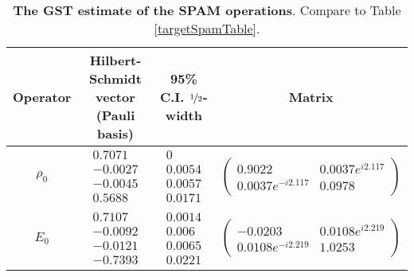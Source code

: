 \documentclass{article}[11pt]
\begin{document}
\begin{table}[h]
\begin{center}
\begin{tabular}[l]{|c|c|c|c|}
\hline
Operator & Hilbert-Schmidt vector (Pauli basis) & 95\% C.I. $\nicefrac{1}{2}$-width & Matrix \\ \hline
$\rho_{0}$ & $ \begin{array}{c}
0.7071 \\ 
-0.0027 \\ 
-0.0045 \\ 
0.5688
 \end{array} $
 & $ \begin{array}{c}
0 \\ 
0.0054 \\ 
0.0057 \\ 
0.0171
 \end{array} $
 & $ \left(\!\!\begin{array}{cc}
0.9022 & 0.0037e^{i2.117} \\ 
0.0037e^{-i2.117} & 0.0978
 \end{array}\!\!\right) $
 \\ \hline
$E_{0}$ & $ \begin{array}{c}
0.7107 \\ 
-0.0092 \\ 
-0.0121 \\ 
-0.7393
 \end{array} $
 & $ \begin{array}{c}
0.0014 \\ 
0.006 \\ 
0.0065 \\ 
0.0221
 \end{array} $
 & $ \left(\!\!\begin{array}{cc}
-0.0203 & 0.0108e^{i2.219} \\ 
0.0108e^{-i2.219} & 1.0253
 \end{array}\!\!\right) $
 \\ \hline
\end{tabular}

\caption{\textbf{The GST estimate of the SPAM operations}.  Compare to Table \ref{targetSpamTable}.\label{bestGatesetSpamTable}}
\end{center}
\end{table}
\end{document}

